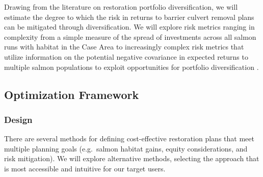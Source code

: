 \documentclass[12pt]{elsarticle}
\begin{document}
Drawing from the literature on restoration portfolio diversification, we will estimate the degree to which the risk in returns to barrier culvert removal plans can be mitigated through diversification. We will explore risk metrics ranging in complexity from a simple measure of the spread of investments across all salmon runs with habitat in the Case Area to increasingly complex risk metrics that utilize information on the potential negative covariance in expected returns to multiple salmon populations to exploit opportunities for portfolio diversification \citep{sanchirico_empirical_2008, jardine_fishermen_2015, johnston_combining_2002}.  

\subsection*{Optimization Framework\label{sec:opt}}

\subsubsection*{Design}

There are several methods for defining cost-effective restoration plans that meet multiple planning goals (e.g.\ salmon habitat gains, equity considerations, and risk mitigation). We will explore alternative methods, selecting the approach that is most accessible and intuitive for our target users. 
\end{document}
